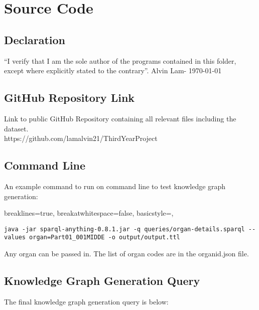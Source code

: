 \chapter{Source Code}
\section{Declaration}
``I verify that I am the sole author of the programs contained in this folder, except where explicitly stated to the contrary''. Alvin Lam- \today

\section{GitHub Repository Link}
Link to public GitHub Repository containing all relevant files including the dataset. \\
https://github.com/lamalvin21/ThirdYearProject

\section{Command Line}
An example command to run on command line to test knowledge graph generation:

\lstset
{
    breaklines=true,
    breakatwhitespace=false,
    basicstyle=\linespread{1}\ttfamily,
}
\begin{lstlisting}
java -jar sparql-anything-0.8.1.jar -q queries/organ-details.sparql --values organ=Part01_001MIDDE -o output/output.ttl
\end{lstlisting}

Any organ can be passed in. The list of organ codes are in the organid.json file.

\section{Knowledge Graph Generation Query}
The final knowledge graph generation query is below:

